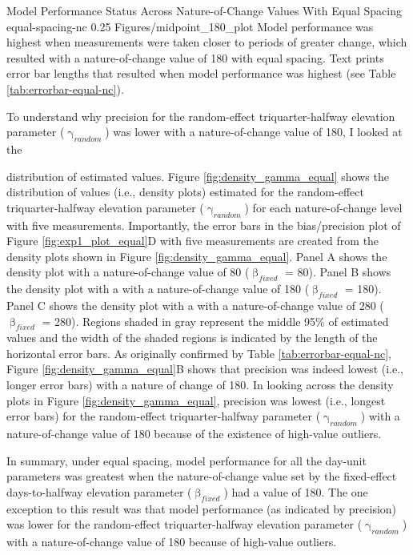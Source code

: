 \documentclass[
12pt, %
twoside,
english]{guelphthesis}
\begin{document}
\begin{apaFigure}
[portrait]
[samepage]
[0cm]
{Model Performance Status Across Nature-of-Change Values With Equal Spacing}
{equal-spacing-nc}
{0.25}
{Figures/midpoint_180_plot}
{Model performance was highest when measurements were taken closer to periods of greater change, which resulted with a nature-of-change value of 180 with equal spacing. Text prints error bar lengths that resulted when model performance was highest (see Table \ref{tab:errorbar-equal-nc}).}
\end{apaFigure}
To understand why precision for the random-effect triquarter-halfway elevation parameter (\(\upgamma_{random}\)) was lower with a nature-of-change value of 180, I looked at the

\noindent distribution of estimated values. Figure \ref{fig:density_gamma_equal} shows the distribution of values (i.e., density plots) estimated for the random-effect triquarter-halfway elevation parameter (\(\upgamma_{random}\)) for each nature-of-change level with five measurements. Importantly, the error bars in the bias/precision plot of Figure \ref{fig:exp1_plot_equal}D with five measurements are created from the density plots shown in Figure \ref{fig:density_gamma_equal}. Panel A shows the density plot with a nature-of-change value of 80 (\(\upbeta_{fixed}\) = 80). Panel B shows the density plot with a with a nature-of-change value of 180 (\(\upbeta_{fixed}\) = 180). Panel C shows the density plot with a with a nature-of-change value of 280 (\(\upbeta_{fixed}\) = 280). Regions shaded in gray represent the middle 95\% of estimated values and the width of the shaded regions is indicated by the length of the horizontal error bars. As originally confirmed by Table \ref{tab:errorbar-equal-nc}, Figure \ref{fig:density_gamma_equal}B shows that precision was indeed lowest (i.e., longer error bars) with a nature of change of 180. In looking across the density plots in Figure \ref{fig:density_gamma_equal}, precision was lowest (i.e., longest error bars) for the random-effect triquarter-halfway parameter (\(\upgamma_{random}\)) with a nature-of-change value of 180 because of the existence of high-value outliers.

In summary, under equal spacing, model performance for all the day-unit parameters was greatest when the nature-of-change value set by the fixed-effect days-to-halfway elevation parameter (\(\upbeta_{fixed}\)) had a value of 180. The one exception to this result was that model performance (as indicated by precision) was lower for the random-effect triquarter-halfway elevation parameter (\(\upgamma_{random}\)) with a nature-of-change value of 180 because of high-value outliers.
\end{document}
